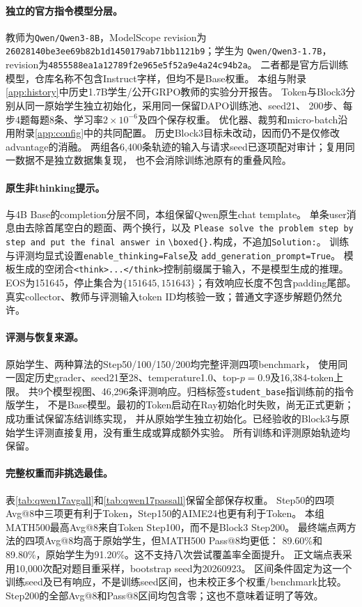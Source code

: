 \paragraph{独立的官方指令模型分层。}
教师为\texttt{Qwen/Qwen3-8B}，ModelScope revision为
\texttt{26028140be3ee69b82b1d1450179ab71bb1121b9}；学生为
\texttt{Qwen/Qwen3-1.7B}，revision为\texttt{4855588ea1a12789f2e965e5f52a9e4a24c94b2a}。
二者都是官方后训练模型，仓库名称不包含Instruct字样，但均不是Base权重。
本组与附录\ref{app:history}中历史1.7B学生/公开GRPO教师的实验分开报告。
Token与Block3分别从同一原始学生独立初始化，采用同一保留DAPO训练池、seed21、
200步、每步4题每题8条、学习率$2\times10^{-6}$及四个保存权重。
优化器、裁剪和micro-batch沿用附录\ref{app:config}中的共同配置。
历史Block3目标未改动，因而仍不是仅修改advantage的消融。
两组各6,400条轨迹的输入与请求seed已逐项配对审计；复用同一数据不是独立数据集复现，
也不会消除训练池原有的重叠风险。

\paragraph{原生非thinking提示。}
与4B Base的completion分层不同，本组保留Qwen原生chat template。
单条user消息由去除首尾空白的题面、两个换行，以及
\texttt{Please solve the problem step by step and put the final answer in}
\verb|\boxed{}.|构成，不追加\texttt{Solution:}。
训练与评测均显式设置\texttt{enable\_thinking=False}及
\texttt{add\_generation\_prompt=True}。
模板生成的空闭合\texttt{<think>...</think>}控制前缀属于输入，不是模型生成的推理。
EOS为151645，停止集合为$\{151645,151643\}$；有效响应长度不包含padding尾部。
真实collector、教师与评测输入token ID均核验一致；普通文字逐步解题仍然允许。

\paragraph{评测与恢复来源。}
原始学生、两种算法的Step50/100/150/200均完整评测四项benchmark，
使用同一固定历史grader、seed21至28、temperature1.0、top-$p=0.9$及16,384-token上限。
共9个模型视图、46,296条评测响应。归档标签\texttt{student\_base}指训练前的指令版学生，
不是Base模型。最初的Token启动在Ray初始化时失败，尚无正式更新；成功重试保留冻结训练实现，
并从原始学生独立初始化。已经验收的Block3与原始学生评测直接复用，没有重生成或算成额外实验。
所有训练和评测原始轨迹均保留。

\paragraph{完整权重而非挑选最佳。}
表\ref{tab:qwen17avgall}和\ref{tab:qwen17passall}保留全部保存权重。
Step50的四项Avg@8中三项更有利于Token，Step150的AIME24也更有利于Token。
本组MATH500最高Avg@8来自Token Step100，而不是Block3 Step200。
最终端点两方法的四项Avg@8均高于原始学生，但MATH500 Pass@8均更低：
89.60\%和89.80\%，原始学生为91.20\%。这不支持八次尝试覆盖率全面提升。
正文端点表采用10,000次配对题目重采样，bootstrap seed为20260923。
区间条件固定为这一个训练seed及已有响应，不是训练seed区间，也未校正多个权重/benchmark比较。
Step200的全部Avg@8和Pass@8区间均包含零；这也不意味着证明了等效。


